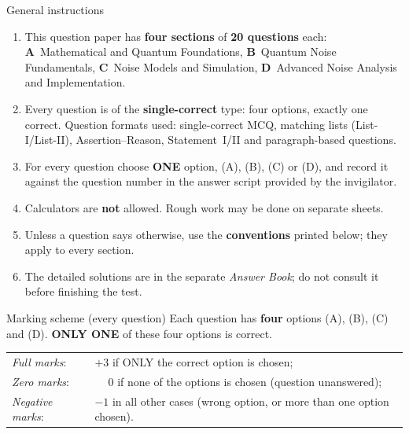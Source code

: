 \documentclass[11pt,a4paper]{article}
\begin{document}
\vspace{6pt}
\begin{infobox}{General instructions}
\begin{enumerate}[leftmargin=1.4em, itemsep=1pt, topsep=1pt]
\item This question paper has \textbf{four sections} of \textbf{20 questions} each:
\textbf{A}~Mathematical and Quantum Foundations, \textbf{B}~Quantum Noise Fundamentals, \textbf{C}~Noise Models and Simulation, \textbf{D}~Advanced Noise Analysis and Implementation.
\item Every question is of the \textbf{single-correct} type: four options, exactly one correct. Question formats used:
single-correct MCQ, matching lists (List-I/List-II), Assertion--Reason, Statement~I/II and paragraph-based questions.
\item For every question choose \textbf{ONE} option, (A), (B), (C) or (D), and record it against the question number in the answer script provided by the invigilator.
\item Calculators are \textbf{not} allowed. Rough work may be done on separate sheets.
\item Unless a question says otherwise, use the \textbf{conventions} printed below; they apply to every section.
\item The detailed solutions are in the separate \emph{Answer Book}; do not consult it before finishing the test.
\end{enumerate}
\end{infobox}
\begin{infobox}{Marking scheme (every question)}
Each question has \textbf{four} options (A), (B), (C) and (D). \textbf{ONLY ONE} of these four options is correct.\\[2pt]
\begin{tabular}{@{}ll@{}}
\emph{Full marks}: & $+3$ if ONLY the correct option is chosen;\\
\emph{Zero marks}: & $\phantom{+}0$ if none of the options is chosen (question unanswered);\\
\emph{Negative marks}: & $-1$ in all other cases (wrong option, or more than one option chosen).
\end{tabular}
\end{infobox}
\end{document}
